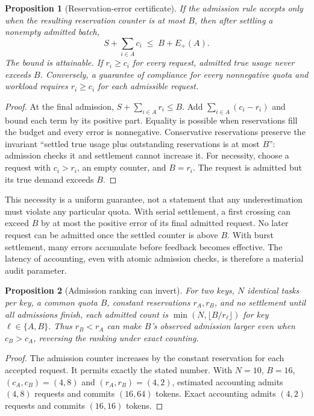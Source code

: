 \documentclass[manuscript,screen]{acmart}
\newtheorem{proposition}{Proposition}
\begin{document}
\begin{proposition}[Reservation-error certificate]\label{prop:error}
If the admission rule accepts only when the resulting reservation counter is at most $B$, then after settling a nonempty admitted batch,
\begin{equation}
S+\sum_{i\in A}c_i\;\leq\;B+E_+(A).\label{eq:error}
\end{equation}
The bound is attainable. If $r_i\geq c_i$ for every request, admitted true usage never exceeds $B$. Conversely, a guarantee of compliance for every nonnegative quota and workload requires $r_i\geq c_i$ for each admissible request.
\end{proposition}
\begin{proof}
At the final admission, $S+\sum_{i\in A}r_i\leq B$. Add $\sum_{i\in A}(c_i-r_i)$ and bound each term by its positive part. Equality is possible when reservations fill the budget and every error is nonnegative. Conservative reservations preserve the invariant ``settled true usage plus outstanding reservations is at most $B$'': admission checks it and settlement cannot increase it. For necessity, choose a request with $c_i>r_i$, an empty counter, and $B=r_i$. The request is admitted but its true demand exceeds $B$.
\end{proof}

This necessity is a uniform guarantee, not a statement that any underestimation must violate any particular quota. With serial settlement, a first crossing can exceed $B$ by at most the positive error of its final admitted request. No later request can be admitted once the settled counter is above $B$. With burst settlement, many errors accumulate before feedback becomes effective. The latency of accounting, even with atomic admission checks, is therefore a material audit parameter.

\begin{proposition}[Admission ranking can invert]\label{prop:invert}
For two keys, $N$ identical tasks per key, a common quota $B$, constant reservations $r_A,r_B$, and no settlement until all admissions finish, each admitted count is $\min(N,\lfloor B/r_\ell\rfloor)$ for key $\ell\in\{A,B\}$. Thus $r_B<r_A$ can make $B$'s observed admission larger even when $c_B>c_A$, reversing the ranking under exact counting.
\end{proposition}
\begin{proof}
The admission counter increases by the constant reservation for each accepted request. It permits exactly the stated number. With $N=10$, $B=16$, $(c_A,c_B)=(4,8)$ and $(r_A,r_B)=(4,2)$, estimated accounting admits $(4,8)$ requests and commits $(16,64)$ tokens. Exact accounting admits $(4,2)$ requests and commits $(16,16)$ tokens.
\end{proof}
\end{document}
